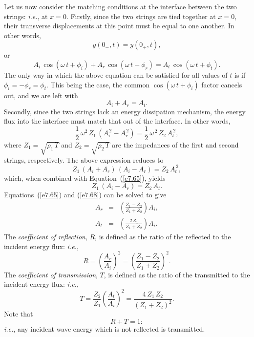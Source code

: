 Let us now consider the matching conditions at the interface between the two
strings: {\em i.e.}, at $x=0$. Firstly, since the two strings are tied together at $x=0$, their
transverse displacements  at this point  must be equal to one another.
In other words,
\begin{equation}
y(0_-,t) = y(0_+,t),
\end{equation}
or
\begin{equation}
A_i\,\cos(\omega\,t+\phi_i)  +A_r\,\cos(\omega\,t-\phi_r)=A_t\,\cos(\omega\,t+\phi_t).
\end{equation}
The only way in which the above equation can be satisfied for all values of $t$ is if $\phi_i=-\phi_r=\phi_t$. This being the case, the common $\cos(\omega\,t+\phi_i)$ factor
cancels out, and we are left with
\begin{equation}\label{e7.65}
A_i + A_r = A_t.
\end{equation}
Secondly, since the two strings lack an energy dissipation
mechanism, the energy flux into the interface must match that out of the
interface. In other words,
\begin{equation}
\frac{1}{2}\,\omega^2\,Z_1\,(A_i^{\,2}-A_r^{\,2}) = \frac{1}{2}\,\omega^{\,2}\,Z_2\,A_t^{\,2},
\end{equation}
where $Z_1=\sqrt{\rho_1\,T}$ and $Z_2=\sqrt{\rho_2\,T}$ are the impedances of the
first  and second strings, respectively. The above expression
reduces to
\begin{equation}
Z_1\,(A_i+A_r)\,(A_i-A_r) = Z_2\,A_t^{\,2},
\end{equation}
which, when combined with Equation~(\ref{e7.65}), yields
\begin{equation}\label{e7.68}
Z_1\,(A_i-A_r) = Z_2\,A_t.
\end{equation}
Equations~(\ref{e7.65}) and (\ref{e7.68}) can be solved to give
\begin{eqnarray}
A_r &=&\left(\frac{Z_1-Z_2}{Z_1+Z_2}\right) A_i,\label{e7.69}\\[0.5ex]
A_t &=& \left(\frac{2\,Z_1}{Z_1+Z_2}\right) A_i.\label{e7.70}
\end{eqnarray}
The {\em coefficient of reflection}, $R$, is defined as the ratio of the reflected to the incident
energy flux: {\em i.e.}, 
\begin{equation}\label{e7.71}
R = \left(\frac{A_r}{A_i}\right)^2 = \left(\frac{Z_1-Z_2}{Z_1+Z_2}\right)^2.
\end{equation}
The {\em coefficient of transmission}, $T$, is defined as the ratio of the
transmitted to the incident energy flux: {\em i.e.}, 
\begin{equation}\label{e7.72}
T = \frac{Z_2}{Z_1}\left(\frac{A_t}{A_i}\right)^2= \frac{4\,Z_1\,Z_2}{(Z_1+Z_2)^2}.
\end{equation}
Note that
\begin{equation}
R+T=1:
\end{equation}
{\em i.e.}, any incident wave energy which is not reflected is transmitted. 

